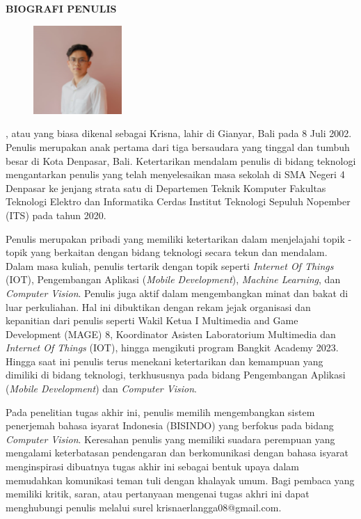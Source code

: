 \begin{center}
  \Large
  \textbf{BIOGRAFI PENULIS}
\end{center}


\vspace{2ex}

\begin{figure}
  \centering
  \vspace{-3ex}
  \includegraphics[width=0.3\textwidth]{BiografiPenulis/foto-formal.png}
  \vspace{-4ex}
\end{figure}

\name{}, atau yang biasa dikenal sebagai Krisna, lahir di Gianyar, Bali pada 8 Juli 2002. Penulis merupakan anak pertama dari tiga bersaudara yang tinggal dan tumbuh besar di Kota Denpasar, Bali. Ketertarikan mendalam penulis di bidang teknologi mengantarkan penulis yang telah menyelesaikan masa sekolah di SMA Negeri 4 Denpasar ke jenjang strata satu di Departemen Teknik Komputer Fakultas Teknologi Elektro dan Informatika Cerdas Institut Teknologi Sepuluh Nopember (ITS) pada tahun 2020.

Penulis merupakan pribadi yang memiliki ketertarikan dalam menjelajahi topik - topik yang berkaitan dengan bidang teknologi secara tekun dan mendalam. Dalam masa kuliah, penulis tertarik dengan topik seperti \emph{Internet Of Things} (IOT), Pengembangan Aplikasi (\emph{Mobile Development}), \emph{Machine Learning}, dan \emph{Computer Vision}. Penulis juga aktif dalam mengembangkan minat dan bakat di luar perkuliahan. Hal ini dibuktikan dengan rekam jejak organisasi dan kepanitian dari penulis seperti Wakil Ketua I Multimedia and Game Development (MAGE) 8, Koordinator Asisten Laboratorium Multimedia dan \emph{Internet Of Things} (IOT), hingga mengikuti program Bangkit Academy 2023. Hingga saat ini penulis terus menekani ketertarikan dan kemampuan yang dimiliki di bidang teknologi, terkhususnya pada bidang Pengembangan Aplikasi (\emph{Mobile Development}) dan \emph{Computer Vision}.

Pada penelitian tugas akhir ini, penulis memilih mengembangkan sistem penerjemah bahasa isyarat Indonesia (BISINDO) yang berfokus pada bidang \emph{Computer Vision}. Keresahan penulis yang memiliki suadara perempuan yang mengalami keterbatasan pendengaran dan berkomunikasi dengan bahasa isyarat menginspirasi dibuatnya tugas akhir ini sebagai bentuk upaya dalam memudahkan komunikasi teman tuli dengan khalayak umum. Bagi pembaca yang memiliki kritik, saran, atau pertanyaan mengenai tugas akhri ini dapat menghubungi penulis melalui surel krisnaerlangga08@gmail.com.
